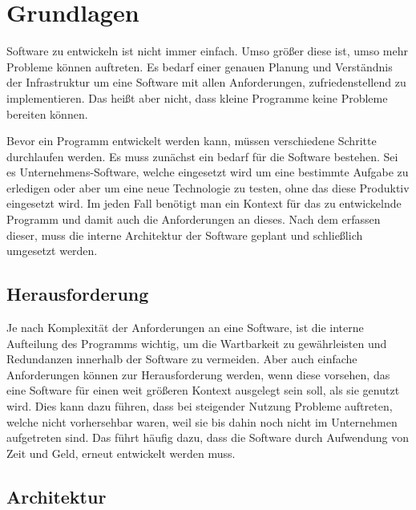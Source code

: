 \chapter{Grundlagen}
\label{chap:grundlagen}
Software zu entwickeln ist nicht immer einfach. Umso größer diese ist, umso mehr Probleme können auftreten. Es bedarf einer genauen Planung und Verständnis der Infrastruktur um eine Software mit allen Anforderungen, zufriedenstellend zu implementieren. Das heißt aber nicht, dass kleine Programme keine Probleme bereiten können. 

Bevor ein Programm entwickelt werden kann, müssen verschiedene Schritte durchlaufen werden. Es muss zunächst ein bedarf für die Software bestehen. Sei es Unternehmens-Software, welche eingesetzt wird um eine bestimmte Aufgabe zu erledigen oder aber um eine neue Technologie zu testen, ohne das diese Produktiv eingesetzt wird. Im jeden Fall benötigt man ein Kontext für das zu entwickelnde Programm und damit auch die Anforderungen an dieses. Nach dem erfassen dieser, muss die interne Architektur der Software geplant und schließlich umgesetzt werden.

\section{Herausforderung}
Je nach Komplexität der Anforderungen an eine Software, ist die interne Aufteilung des Programms wichtig, um die Wartbarkeit zu gewährleisten und Redundanzen innerhalb der Software zu vermeiden.
Aber auch einfache Anforderungen können zur Herausforderung werden, wenn diese vorsehen, das eine Software für einen weit größeren Kontext ausgelegt sein soll, als sie genutzt wird. Dies kann dazu führen, dass bei steigender Nutzung Probleme auftreten, welche nicht vorhersehbar waren, weil sie bis dahin noch nicht im Unternehmen aufgetreten sind. Das führt häufig dazu, dass die Software durch Aufwendung von Zeit und Geld, erneut entwickelt werden muss. 

\section{Architektur}
